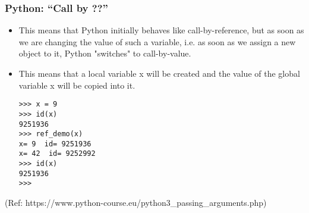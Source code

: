 \begin{frame}[fragile]\frametitle{Python: ``Call by ??'' }

    \begin{itemize}
    \item This means that Python initially behaves like call-by-reference, but as soon as we are changing the value of such a variable, i.e. as soon as we assign a new object to it, Python "switches" to call-by-value. 
    \item This means that a local variable x will be created and the value of the global variable x will be copied into it. 
            \begin{lstlisting}
>>> x = 9
>>> id(x)
9251936
>>> ref_demo(x)
x= 9  id= 9251936
x= 42  id= 9252992
>>> id(x)
9251936
>>> 
\end{lstlisting}

            \end{itemize}
  
   (Ref: https://www.python-course.eu/python3\_passing\_arguments.php)
   \end{frame}
%
%
%
%
%
%
%
%

